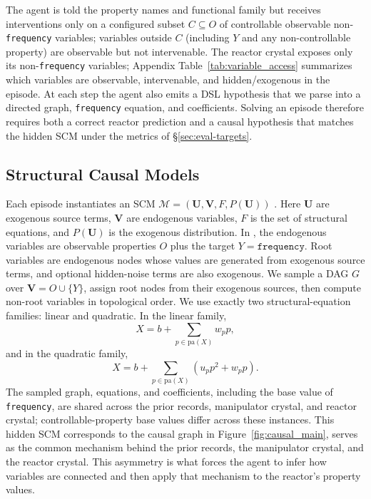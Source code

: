 The agent is told the property names and functional family but receives
interventions only on a configured subset \(C\subseteq O\) of controllable
observable non-\texttt{frequency} variables; variables outside \(C\)
(including \(Y\) and any non-controllable property) are observable but not
intervenable. The reactor crystal exposes only its non-\texttt{frequency}
variables; Appendix Table~\ref{tab:variable_access} summarizes which variables
are observable, intervenable, and hidden/exogenous in the episode. At each step
the agent also emits a DSL
hypothesis that we parse into a directed graph, \texttt{frequency} equation,
and coefficients. Solving an episode therefore requires both a correct
reactor prediction and a causal hypothesis that matches the hidden SCM under
the metrics of \S\ref{sec:eval-targets}.

\subsection{Structural Causal Models}
\label{sec:scm-construction}

Each episode instantiates an SCM
\(\mathcal{M}=(\mathbf{U},\mathbf{V},F,P(\mathbf{U}))\) \citep{Pearl_2009}.
Here \(\mathbf{U}\) are exogenous source terms, \(\mathbf{V}\) are endogenous
variables, \(F\) is the set of structural equations, and \(P(\mathbf{U})\) is
the exogenous distribution. In \projectname{}, the endogenous variables are
observable properties \(O\) plus the target \(Y=\texttt{frequency}\). Root
variables are endogenous nodes whose values are generated from exogenous source
terms, and optional hidden-noise terms are also exogenous. We sample a DAG
\(G\) over \(\mathbf{V}=O\cup\{Y\}\), assign root nodes from their exogenous
sources, then compute non-root variables in topological order. We use exactly
two structural-equation families: linear and quadratic. In the linear family,
\[
X = b + \sum_{p \in \mathrm{pa}(X)} w_p p,
\]
and in the quadratic family,
\[
X = b + \sum_{p \in \mathrm{pa}(X)} (u_p p^2 + w_p p).
\]
The sampled graph, equations, and coefficients, including the base value of
\texttt{frequency}, are shared across the prior records, manipulator crystal,
and reactor crystal; controllable-property base values differ across these
instances. This hidden
SCM corresponds to the causal graph in Figure~\ref{fig:causal_main}, serves as the common mechanism behind the prior records, the manipulator crystal,
and the reactor crystal. This asymmetry is what forces the agent to infer how variables are
connected and then apply that mechanism to the reactor's property values.

